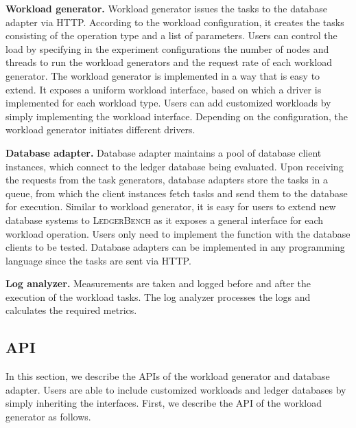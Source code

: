 \documentclass[11pt,dvipdfm]{article}
\newcommand{\systemname}{\textsc{LedgerBench}\xspace}
\begin{document}
\textbf{Workload generator.} Workload generator issues the tasks to the database adapter via HTTP. According to the workload configuration, it creates the tasks consisting of the operation type and a list of parameters. 
Users can control the load by specifying in the experiment configurations the number of nodes and threads to run the workload generators and the request rate of each workload generator. The workload generator is implemented in a way that is easy to extend. It exposes a uniform workload interface, based on which a driver is implemented for each workload type. Users can add customized workloads by simply implementing the workload interface. 
Depending on the configuration, the workload generator initiates different drivers.

\textbf{Database adapter.}
Database adapter maintains a pool of database client instances, which connect to the ledger database being evaluated. Upon receiving the requests from the task generators, database adapters store the tasks in a queue, from which the client instances fetch tasks and send them to the database for execution. Similar to workload generator, it is easy for users to extend new database systems to \systemname as
it exposes a general interface for each workload operation. Users only need to implement the function with the database clients to be tested. Database adapters can be implemented in any programming language since the tasks are sent via HTTP.

\textbf{Log analyzer.} Measurements are taken and logged before and after the execution of the workload tasks. The log analyzer processes the logs and calculates the required metrics.

\subsection{API}
\label{subsec:api}

In this section, we describe the APIs of the workload generator and database adapter. Users are able to include customized workloads and ledger databases by simply inheriting the interfaces. First, we describe the API of the workload generator as follows.
\end{document}

